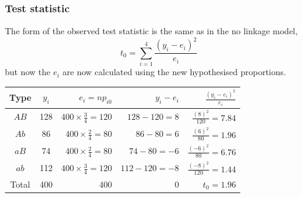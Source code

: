 \documentclass[a4paper]{article}\usepackage[]{graphicx}\usepackage[]{xcolor}
\begin{document}
\subsubsection{Test statistic}
The form of the observed test statistic is the same as in the no linkage model,
\[
	t_0 = \sum_{i=1}^{4} \frac{(y_i - e_i)^2}{e_i}
\]
but now the \( e_i \) are now calculated using the new hypothesised proportions.
\begin{table}[H]
	\centering
	\begin{tabular}{@{}ccrrr@{}}
	Type 	 & \( y_i \) & \( e_i = np_{i0} \) 				  & \( y_i - e_i \)      & \( \frac{(y_i - e_i)^2}{e_i} \)  \\ \midrule
	\( AB \) & 128  	 & \( 400 \times \frac{3}{4} = 120 \) & \( 128 - 120 = 8 \)  & \( \frac{(8)^2}{120} = 7.84 \)   \\
	\( Ab \) & 86  	     & \( 400 \times \frac{2}{4} = 80  \) & \( 86 - 80 = 6 \) 	 & \( \frac{(6)^2}{80} = 1.96 \)    \\
	\( aB \) & 74 	     & \( 400 \times \frac{2}{4} = 80  \) & \( 74 - 80 = -6 \) 	 & \( \frac{(-6)^2}{80} = 6.76 \)   \\
	\( ab \) & 112 	     & \( 400 \times \frac{3}{4} = 120 \) & \( 112 - 120 = -8 \) & \( \frac{(-8)^2}{120} = 1.44  \) \\ \midrule
	Total 	 & 400	     & 400	  				  		  	  & 0					 & \( t_0 = 1.96 \) 
	\end{tabular}
\end{table}
\end{document}
